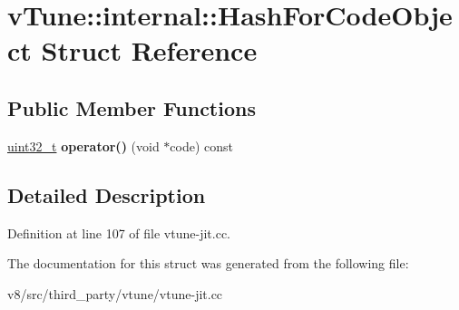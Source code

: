 \hypertarget{structvTune_1_1internal_1_1HashForCodeObject}{}\section{v\+Tune\+:\+:internal\+:\+:Hash\+For\+Code\+Object Struct Reference}
\label{structvTune_1_1internal_1_1HashForCodeObject}
\subsection*{Public Member Functions}
\begin{DoxyCompactItemize}
\item 
\mbox{\label{structvTune_1_1internal_1_1HashForCodeObject_a6bac8420824f26a04c7767005c239f0c}} 
\mbox{\hyperlink{classuint32__t}{uint32\+\_\+t}} {\bfseries operator()} (void $\ast$code) const
\end{DoxyCompactItemize}


\subsection{Detailed Description}


Definition at line 107 of file vtune-\/jit.\+cc.



The documentation for this struct was generated from the following file\+:\begin{DoxyCompactItemize}
\item 
v8/src/third\+\_\+party/vtune/vtune-\/jit.\+cc\end{DoxyCompactItemize}
